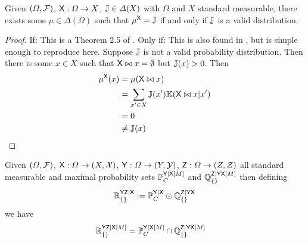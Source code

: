 \begin{theorem}[Validity]\label{th:completion}
Given $(\Omega,\mathcal{F})$, $\mathsf{X}:\Omega\to X$, $\mathbb{J}\in \Delta(X)$ with $\Omega$ and $X$ standard measurable, there exists some $\mu\in \Delta(\Omega)$ such that $\mu^{\mathsf{X}}=\mathbb{J}$ if and only if $\mathbb{J}$ is a valid distribution.
\end{theorem}

\begin{proof}
If:
This is a Theorem 2.5 of \citet{ershov_extension_1975}.
Only if:
This is also found in \citet{ershov_extension_1975}, but is simple enough to reproduce here. Suppose $\mathbb{J}$ is not a valid probability distribution. Then there is some $x\in X$ such that $\mathsf{X}\bowtie x = \emptyset$ but $\mathbb{J}(x)>0$. Then
\begin{align}
    \mu^{\mathsf{X}}(x) &= \mu (\mathsf{X}\bowtie x)\\
    &= \sum_{x'\in X} \mathbb{J}(x') \mathbb{K}(\mathsf{X}\bowtie x|x')\\
    &= 0\\
    &\neq \mathbb{J}(x)
\end{align}
\end{proof}


\begin{lemma}\label{th:intersection}
Given $(\Omega,\mathcal{F})$, $\mathsf{X}:\Omega\to (X,\mathcal{X})$, $\mathsf{Y}:\Omega\to (Y,\mathcal{Y})$, $\mathsf{Z}:\Omega\to (Z,\mathcal{Z})$ all standard measurable and maximal probability sets $\mathbb{P}_C^{\mathsf{Y}|\mathsf{X}[M]}$ and $\mathbb{Q}_{\{\}}^{\mathsf{Z}|\mathsf{YX}[M]}$ then defining
\begin{align}
    \mathbb{R}_{\{\}}^{\mathsf{YZ}|\mathsf{X}} := \mathbb{P}_C^{\mathsf{Y}|\mathsf{X}}\odot \mathbb{Q}_{\{\}}^{\mathsf{Z}|\mathsf{YX}}
\end{align}
we have
\begin{align}
    \mathbb{R}_{\{\}}^{\mathsf{YZ}|\mathsf{X}[M]} &= \mathbb{P}_C^{\mathsf{Y}|\mathsf{X}[M]}\cap \mathbb{Q}_{\{\}}^{\mathsf{Z}|\mathsf{YX}[M]}
\end{align}
\end{lemma}

